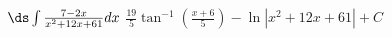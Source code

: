 {$\ds \int \frac{7-2 x}{x^2+12 x+61} dx $}
{$\frac{19}{5} \tan ^{-1}\left(\frac{x+6}{5}\right)-\ln \left|x^2+12 x+61\right|+C$}